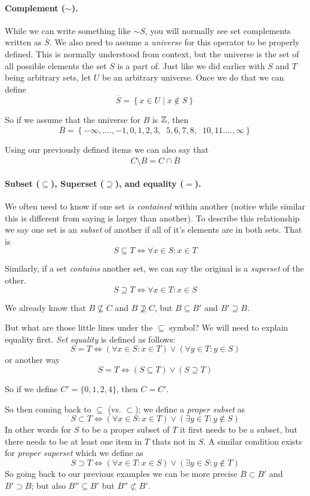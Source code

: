 \documentclass[11pt, oneside]{article}   	%
\begin{document}
\paragraph{Complement ($\sim$).}
While we can write something like $\sim S$, you will normally see set complements written as $\overline{S}$. 
We also need to assume a \emph{universe} for this operator to be properly defined. 
This is normally understood from context, but the universe is the set of all possible elements the set $S$ is a part of. 
Just like we did earlier with $S$ and $T$ being arbitrary sets, let $U$ be an arbitrary universe.
Once we do that we can define 
\[
\overline{S} = \left\{x \in U \mid x \notin S\right\}
\]

So if we assume that the universe for $B$ is $\operatorname{\mathbb{Z}}$,
then 
\[
\overline{B} = \left\{-\infty,....,-1,0,1,2,3,\;\;5,6,7,8,\;\;10,11....,\infty\right\} 
\]

Using our previously defined items we can also say that 
\[
C \setminus B = C \cap \overline{B}
\]

\paragraph{Subset ($\subseteq$), Superset ($\supseteq$), and equality ($=$).}
We often need to know if one set \textit{is contained} within another (notice while similar this is different from saying is larger than another). 
To describe this relationship we say one set is an \emph{subset} of another if all of it's elements are in both sets. 
That is
\[
S \subseteq T \iff \forall x \in S : x \in T
\]

Similarly, if a set \textit{contains} another set, we can say the original is a \emph{superset} of the other. 
\[
S \supseteq T \iff \forall x \in T: x \in S
\] 

We already know that $B \nsubseteq C$ and $B \nsupseteq C$, but $B \subseteq B'$ and $B' \supseteq B$. 

But what are those little lines under the $\subseteq$ symbol? We will need to explain equality first. 
\emph{Set equality} is defined as follows:
\[
S = T \iff \left(\forall x \in S : x \in T\right) \vee \left(\forall y \in T : y \in S\right)
\]
or another way
\[
S = T \iff \left(S \subseteq T\right) \vee \left(S \supseteq T\right)
\]

So if we define $C' = \{0,1,2,4\}$, then $C=C'$.

So then coming back to $\subseteq$ (vs. $\subset$); 
we define a \emph{proper subset} as
\[
S \subset T \iff \left(\forall x \in S : x \in T\right) \vee \left(\exists y \in T : y \notin S\right)
\]
In other words for $S$ to be a proper subset of $T$ it first needs to be a subset, but there needs to be at least one item in $T$ thats not in $S$.
A similar condition exists for \emph{proper superset} which we define as 
\[
S \supset T \iff \left(\forall x \in T : x \in S\right) \vee \left(\exists y \in S : y \notin T\right)
\]
So going back to our previous examples we can be  more precise $B \subset B'$ and $B' \supset B$;
but also $B'' \subseteq B'$ but $B'' \not\subset B'$.
\end{document}
